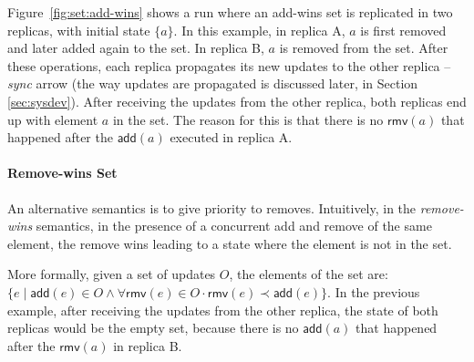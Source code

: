 \documentclass[12pt]{article}
\def\land{\mathrel{\wedge}}
\begin{document}

Figure~\ref{fig:set:add-wins} shows a run where an add-wins set is replicated
in two replicas, with initial state $\{a\}$. 
In this example, in replica A, $a$ is first removed and later added again to 
the set. In replica B, $a$ is removed from the set.
After these operations, each replica propagates its new updates to the other replica 
-- \emph{sync} arrow (the way updates are propagated is discussed later, in 
Section \ref{sec:sysdev}).
After receiving the updates from the other replica, both replicas end up 
with element $a$ in the set. The reason for this is that there is no
$\mathsf{rmv}(a)$ that happened after the $\mathsf{add}(a)$ executed in replica A.

\paragraph{Remove-wins Set}
An alternative semantics is to give priority to removes.
Intuitively, in the \emph{remove-wins} semantics, 
in the presence of a concurrent add and remove of the same element, the 
remove wins leading to a state where the element is not in the set.

More formally, given a set of updates $O$, the elements of the set 
are:
$\{e \mid \mathsf{add}(e) \in O \land \forall \mathsf{rmv}(e) \in O \cdot  \mathsf{rmv}(e) \prec \mathsf{add}(e)\}$.
In the previous example, after receiving the updates from the other replica, 
the state of both replicas 
would be the empty set, because there is no $\mathsf{add}(a)$ that happened after the
$\mathsf{rmv}(a)$ in replica B.
\end{document}
